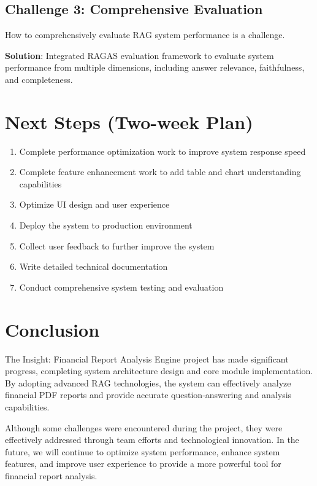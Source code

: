 \documentclass[12pt, a4paper]{article}
\begin{document}
\subsection{Challenge 3: Comprehensive Evaluation}
How to comprehensively evaluate RAG system performance is a challenge.

\textbf{Solution}: Integrated RAGAS evaluation framework to evaluate system performance from multiple dimensions, including answer relevance, faithfulness, and completeness.

\section{Next Steps (Two-week Plan)}

\begin{enumerate}
    \item Complete performance optimization work to improve system response speed
    \item Complete feature enhancement work to add table and chart understanding
          capabilities
    \item Optimize UI design and user experience
    \item Deploy the system to production environment
    \item Collect user feedback to further improve the system
    \item Write detailed technical documentation
    \item Conduct comprehensive system testing and evaluation
\end{enumerate}

\section{Conclusion}

The Insight: Financial Report Analysis Engine project has made significant
progress, completing system architecture design and core module implementation.
By adopting advanced RAG technologies, the system can effectively analyze
financial PDF reports and provide accurate question-answering and analysis
capabilities.

Although some challenges were encountered during the project, they were
effectively addressed through team efforts and technological innovation. In the
future, we will continue to optimize system performance, enhance system
features, and improve user experience to provide a more powerful tool for
financial report analysis.
\end{document}
